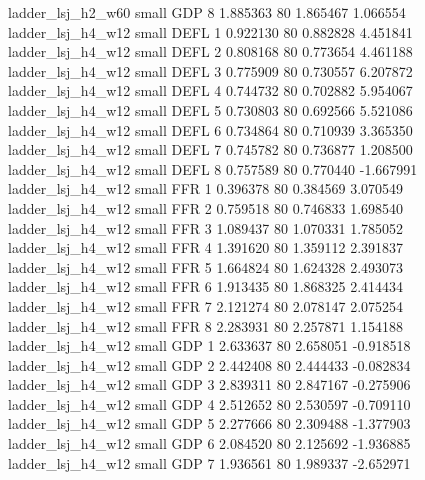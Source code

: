       ladder_lsj_h2_w60      small      GDP                 8 1.885363 80       1.865467           1.066554
       ladder_lsj_h4_w12      small     DEFL                 1 0.922130 80       0.882828           4.451841
       ladder_lsj_h4_w12      small     DEFL                 2 0.808168 80       0.773654           4.461188
       ladder_lsj_h4_w12      small     DEFL                 3 0.775909 80       0.730557           6.207872
       ladder_lsj_h4_w12      small     DEFL                 4 0.744732 80       0.702882           5.954067
       ladder_lsj_h4_w12      small     DEFL                 5 0.730803 80       0.692566           5.521086
       ladder_lsj_h4_w12      small     DEFL                 6 0.734864 80       0.710939           3.365350
       ladder_lsj_h4_w12      small     DEFL                 7 0.745782 80       0.736877           1.208500
       ladder_lsj_h4_w12      small     DEFL                 8 0.757589 80       0.770440          -1.667991
       ladder_lsj_h4_w12      small      FFR                 1 0.396378 80       0.384569           3.070549
       ladder_lsj_h4_w12      small      FFR                 2 0.759518 80       0.746833           1.698540
       ladder_lsj_h4_w12      small      FFR                 3 1.089437 80       1.070331           1.785052
       ladder_lsj_h4_w12      small      FFR                 4 1.391620 80       1.359112           2.391837
       ladder_lsj_h4_w12      small      FFR                 5 1.664824 80       1.624328           2.493073
       ladder_lsj_h4_w12      small      FFR                 6 1.913435 80       1.868325           2.414434
       ladder_lsj_h4_w12      small      FFR                 7 2.121274 80       2.078147           2.075254
       ladder_lsj_h4_w12      small      FFR                 8 2.283931 80       2.257871           1.154188
       ladder_lsj_h4_w12      small      GDP                 1 2.633637 80       2.658051          -0.918518
       ladder_lsj_h4_w12      small      GDP                 2 2.442408 80       2.444433          -0.082834
       ladder_lsj_h4_w12      small      GDP                 3 2.839311 80       2.847167          -0.275906
       ladder_lsj_h4_w12      small      GDP                 4 2.512652 80       2.530597          -0.709110
       ladder_lsj_h4_w12      small      GDP                 5 2.277666 80       2.309488          -1.377903
       ladder_lsj_h4_w12      small      GDP                 6 2.084520 80       2.125692          -1.936885
       ladder_lsj_h4_w12      small      GDP                 7 1.936561 80       1.989337          -2.652971
